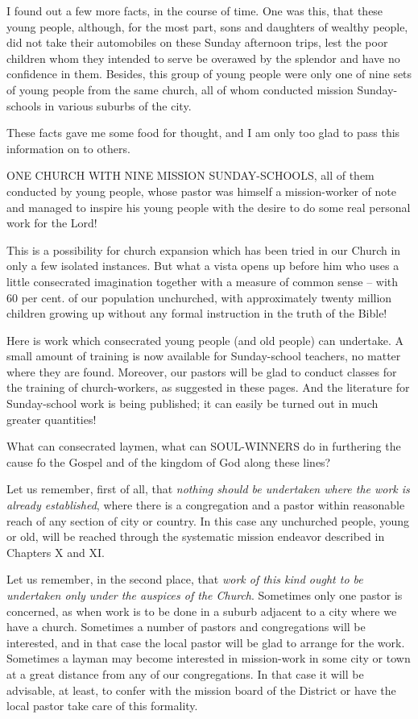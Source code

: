 \documentclass[
]{book}
\begin{document}
I found out a few more facts, in the course of time. One was this, that these young people, although, for the most part, sons and daughters of wealthy people, did not take their automobiles on these Sunday afternoon trips, lest the poor children whom they intended to serve be overawed by the splendor and have no confidence in them. Besides, this group of young people were only one of nine sets of young people from the same church, all of whom conducted mission Sunday-schools in various suburbs of the city.

These facts gave me some food for thought, and I am only too glad to pass this information on to others.

ONE CHURCH WITH NINE MISSION SUNDAY-SCHOOLS, all of them conducted by young people, whose pastor was himself a mission-worker of note and managed to inspire his young people with the desire to do some real personal work for the Lord!

This is a possibility for church expansion which has been tried in our Church in only a few isolated instances. But what a vista opens up before him who uses a little consecrated imagination together with a measure of common sense -- with 60 per cent. of our population unchurched, with approximately twenty million children growing up without any formal instruction in the truth of the Bible!

Here is work which consecrated young people (and old people) can undertake. A small amount of training is now available for Sunday-school teachers, no matter where they are found. Moreover, our pastors will be glad to conduct classes for the training of church-workers, as suggested in these pages. And the literature for Sunday-school work is being published; it can easily be turned out in much greater quantities!

What can consecrated laymen, what can SOUL-WINNERS do in furthering the cause fo the Gospel and of the kingdom of God along these lines?

Let us remember, first of all, that \emph{nothing should be undertaken where the work is already established}, where there is a congregation and a pastor within reasonable reach of any section of city or country. In this case any unchurched people, young or old, will be reached through the systematic mission endeavor described in Chapters X and XI.

Let us remember, in the second place, that \emph{work of this kind ought to be undertaken only under the auspices of the Church}. Sometimes only one pastor is concerned, as when work is to be done in a suburb adjacent to a city where we have a church. Sometimes a number of pastors and congregations will be interested, and in that case the local pastor will be glad to arrange for the work. Sometimes a layman may become interested in mission-work in some city or town at a great distance from any of our congregations. In that case it will be advisable, at least, to confer with the mission board of the District or have the local pastor take care of this formality.
\end{document}
